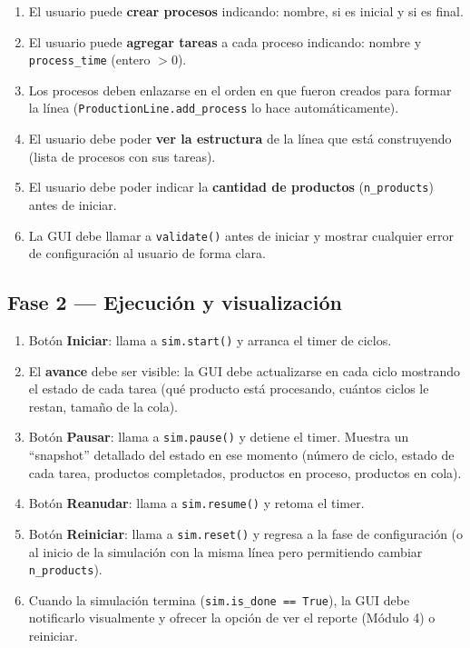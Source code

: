 \documentclass[12pt,letterpaper]{article}
\begin{document}
\begin{enumerate}[leftmargin=2em]
    \item El usuario puede \textbf{crear procesos} indicando: nombre, si es
          inicial y si es final.
    \item El usuario puede \textbf{agregar tareas} a cada proceso indicando:
          nombre y \texttt{process\_time} (entero $> 0$).
    \item Los procesos deben enlazarse en el orden en que fueron creados para
          formar la línea (\texttt{ProductionLine.add\_process} lo hace
          automáticamente).
    \item El usuario debe poder \textbf{ver la estructura} de la línea que
          está construyendo (lista de procesos con sus tareas).
    \item El usuario debe poder indicar la \textbf{cantidad de productos}
          (\texttt{n\_products}) antes de iniciar.
    \item La GUI debe llamar a \texttt{validate()} antes de iniciar y mostrar
          cualquier error de configuración al usuario de forma clara.
\end{enumerate}

\subsection{Fase 2 — Ejecución y visualización}

\begin{enumerate}[leftmargin=2em]
    \item Botón \textbf{Iniciar}: llama a \texttt{sim.start()} y arranca el
          timer de ciclos.
    \item El \textbf{avance} debe ser visible: la GUI debe actualizarse en
          cada ciclo mostrando el estado de cada tarea (qué producto está
          procesando, cuántos ciclos le restan, tamaño de la cola).
    \item Botón \textbf{Pausar}: llama a \texttt{sim.pause()} y detiene el
          timer. Muestra un ``snapshot'' detallado del estado en ese momento
          (número de ciclo, estado de cada tarea, productos completados,
          productos en proceso, productos en cola).
    \item Botón \textbf{Reanudar}: llama a \texttt{sim.resume()} y retoma el
          timer.
    \item Botón \textbf{Reiniciar}: llama a \texttt{sim.reset()} y regresa a
          la fase de configuración (o al inicio de la simulación con la misma
          línea pero permitiendo cambiar \texttt{n\_products}).
    \item Cuando la simulación termina (\texttt{sim.is\_done == True}), la GUI
          debe notificarlo visualmente y ofrecer la opción de ver el reporte
          (Módulo 4) o reiniciar.
\end{enumerate}
\end{document}
